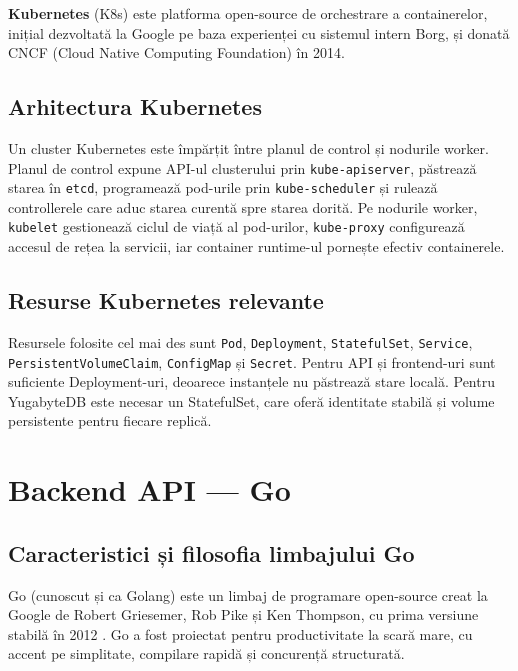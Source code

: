 \textbf{Kubernetes} (K8s) \cite{burns2016kubernetes, kubernetes2024} este
platforma open-source de orchestrare a containerelor, inițial dezvoltată
la Google pe baza experienței cu sistemul intern Borg, și donată CNCF
(Cloud Native Computing Foundation) în 2014.

\subsection{Arhitectura Kubernetes}
\label{subsec:k8s_arhitectura}

Un cluster Kubernetes este împărțit între planul de control și nodurile worker.
Planul de control expune API-ul clusterului prin \texttt{kube-apiserver}, păstrează
starea în \texttt{etcd}, programează pod-urile prin \texttt{kube-scheduler} și
rulează controllerele care aduc starea curentă spre starea dorită. Pe nodurile
worker, \texttt{kubelet} gestionează ciclul de viață al pod-urilor,
\texttt{kube-proxy} configurează accesul de rețea la servicii, iar container
runtime-ul pornește efectiv containerele.

\subsection{Resurse Kubernetes relevante}
\label{subsec:k8s_resurse}

Resursele folosite cel mai des sunt \texttt{Pod}, \texttt{Deployment},
\texttt{StatefulSet}, \texttt{Service}, \texttt{PersistentVolumeClaim},
\texttt{ConfigMap} și \texttt{Secret}. Pentru API și frontend-uri sunt suficiente
Deployment-uri, deoarece instanțele nu păstrează stare locală. Pentru YugabyteDB
este necesar un StatefulSet, care oferă identitate stabilă și volume persistente
pentru fiecare replică.

\section{Backend API — Go}
\label{sec:golang}

\subsection{Caracteristici și filosofia limbajului Go}
\label{subsec:go_caracteristici}

Go (cunoscut și ca Golang) este un limbaj de programare open-source creat
la Google de Robert Griesemer, Rob Pike și Ken Thompson, cu prima versiune
stabilă în 2012 \cite{golangspec2024}. Go a fost proiectat pentru productivitate
la scară mare, cu accent pe simplitate, compilare rapidă și concurență structurată.

